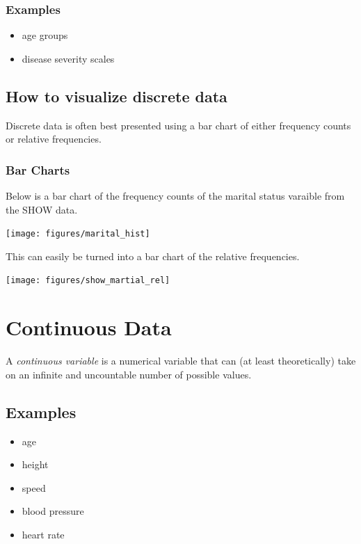 \documentclass[]{book}
\providecommand{\tightlist}{%
  \setlength{\itemsep}{0pt}\setlength{\parskip}{0pt}}
\theoremstyle{definition}
\theoremstyle{definition}
\theoremstyle{definition}
\theoremstyle{remark}
\begin{document}
\hypertarget{examples-1}{%
\subsection{Examples}\label{examples-1}}

\begin{itemize}
\tightlist
\item
  age groups
\item
  disease severity scales
\end{itemize}

\hypertarget{how-to-visualize-discrete-data}{%
\section{How to visualize discrete data}\label{how-to-visualize-discrete-data}}

Discrete data is often best presented using a bar chart of either frequency counts or relative frequencies.

\hypertarget{bar-charts}{%
\subsection{Bar Charts}\label{bar-charts}}

Below is a bar chart of the frequency counts of the marital status varaible from the SHOW data.

\texttt{[image: figures/marital\_hist]}

This can easily be turned into a bar chart of the relative frequencies.

\texttt{[image: figures/show\_martial\_rel]}

\hypertarget{continuous}{%
\chapter{Continuous Data}\label{continuous}}

A \emph{continuous variable} is a numerical variable that can (at least theoretically) take on an infinite and uncountable number of possible values.

\hypertarget{examples-2}{%
\section{Examples}\label{examples-2}}

\begin{itemize}
\tightlist
\item
  age
\item
  height
\item
  speed
\item
  blood pressure
\item
  heart rate
\end{itemize}
\end{document}
